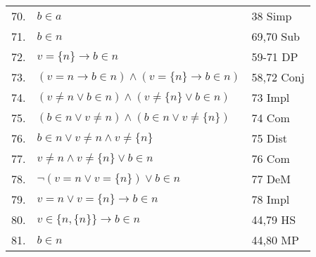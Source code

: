 \documentclass[12pt, a4paper]{article}
\begin{document}
\begin{table}[h!]
    \begin{center}
        \begin{tabular}{l l l}
        \hline
        
        70.& \hspace{30mm}$b\in a$\hspace{128mm} & 38 Simp\\
        
        71.& \hspace{30mm}$b\in n$ & 69,70 Sub\\
        
        72.& \hspace{20mm}$v=\{n\}\rightarrow b\in n$ & 59-71 DP\\
        
        73.& \hspace{20mm}$(v=n\rightarrow b\in n)\wedge(v=\{n\}\rightarrow b\in n)$ & 58,72 Conj\\
        
        74.& \hspace{20mm}$(v\neq n\vee b\in n)\wedge(v\neq\{n\}\vee b\in n)$ & 73 Impl\\
        
        75.& \hspace{20mm}$(b\in n\vee v\neq n)\wedge(b\in n\vee v\neq\{n\})$ & 74 Com\\
        
        76.& \hspace{20mm}$b\in n\vee v\neq n\wedge v\neq\{n\}$ & 75 Dist\\
        
        77.& \hspace{20mm}$v\neq n\wedge v\neq\{n\}\vee b\in n$ & 76 Com\\
        
        78.& \hspace{20mm}$\neg(v=n\vee v=\{n\})\vee b\in n$ & 77 DeM\\
        
        79.& \hspace{20mm}$v=n\vee v=\{n\}\rightarrow b\in n$ & 78 Impl\\
        
        80.& \hspace{20mm}$v\in\{n,\{n\}\}\rightarrow b\in n$ & 44,79 HS\\
        
        81.& \hspace{20mm}$b\in n$ & 44,80 MP\\
        

\end{tabular}
\end{center}
\end{table}
\end{document}
